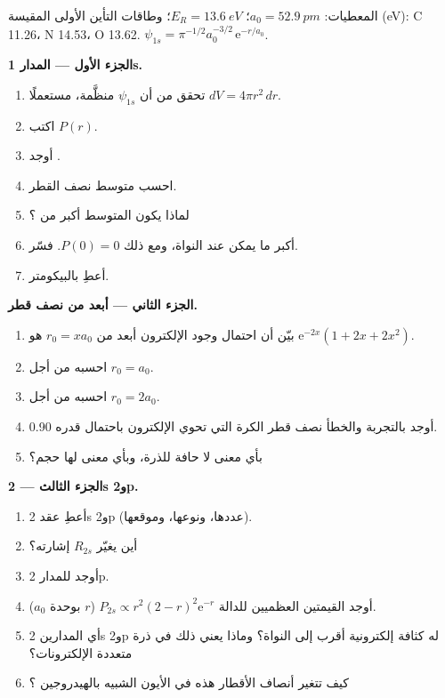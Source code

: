 \begin{problem}
\label{pb:b2:atomic-orbitals:1}
المعطيات: $a_0 = \qty{52.9}{pm}$؛ $E_R = \qty{13.6}{eV}$؛ وطاقات التأين الأولى المقيسة
(\unit{eV}): C 11.26، N 14.53، O 13.62. $\psi_{1s} = \pi^{-1/2}a_0^{-3/2}\,
\mathrm e^{-r/a_0}$.

\medskip
\noindent\textbf{الجزء الأول --- المدار 1s.}
\begin{enumerate}
  \item تحقق من أن $\psi_{1s}$ منظَّمة، مستعملًا $dV = 4\pi r^2\,dr$.
  \item اكتب  $P(r)$.
  \item أوجد .
  \item احسب متوسط نصف القطر.
  \item لماذا يكون المتوسط أكبر من ؟
  \item {} أكبر ما يمكن عند النواة، ومع ذلك $P(0) = 0$.
        فسّر.
  \item أعطِ  بالبيكومتر.
\end{enumerate}

\medskip
\noindent\textbf{الجزء الثاني --- أبعد من نصف قطر.}
\begin{enumerate}[resume]
  \item بيّن أن احتمال وجود الإلكترون أبعد من $r_0 =
        xa_0$ هو $\mathrm e^{-2x}(1 + 2x + 2x^2)$.
  \item احسبه من أجل $r_0 = a_0$.
  \item احسبه من أجل $r_0 = 2a_0$.
  \item أوجد بالتجربة والخطأ نصف قطر الكرة التي تحوي الإلكترون
        باحتمال قدره 0.90.
  \item بأي معنى لا حافة للذرة، وبأي معنى لها حجم؟
\end{enumerate}

\medskip
\noindent\textbf{الجزء الثالث --- 2s و2p.}
\begin{enumerate}[resume]
  \item أعطِ عقد 2s و2p (عددها، ونوعها، وموقعها).
  \item أين يغيّر $R_{2s}$ إشارته؟
  \item أوجد  للمدار 2p.
  \item أوجد القيمتين العظميين للدالة $P_{2s} \propto r^2(2 - r)^2\mathrm e^{-r}$ ($r$ بوحدة
        $a_0$).
  \item أي المدارين 2s و2p له كثافة إلكترونية أقرب إلى النواة؟ وماذا
        يعني ذلك في ذرة متعددة الإلكترونات؟
  \item كيف تتغير أنصاف الأقطار هذه في الأيون الشبيه بالهيدروجين ؟
\end{enumerate}


\end{problem}
